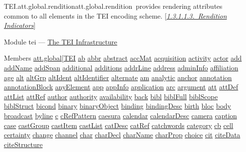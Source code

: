 \begin{reflist}
\item[]\begin{specHead}{TEI.att.global.rendition}{att.global.rendition} provides rendering attributes common to all elements in the TEI encoding scheme. [\textit{\hyperref[STGAre]{1.3.1.1.3.\ Rendition Indicators}}]\end{specHead} 
    \item[{Module}]
  tei — \hyperref[ST]{The TEI Infrastructure}
    \item[{Members}]
  \hyperref[TEI.att.global]{att.global}[\hyperref[TEI.TEI]{TEI} \hyperref[TEI.ab]{ab} \hyperref[TEI.abbr]{abbr} \hyperref[TEI.abstract]{abstract} \hyperref[TEI.accMat]{accMat} \hyperref[TEI.acquisition]{acquisition} \hyperref[TEI.activity]{activity} \hyperref[TEI.actor]{actor} \hyperref[TEI.add]{add} \hyperref[TEI.addName]{addName} \hyperref[TEI.addSpan]{addSpan} \hyperref[TEI.additional]{additional} \hyperref[TEI.additions]{additions} \hyperref[TEI.addrLine]{addrLine} \hyperref[TEI.address]{address} \hyperref[TEI.adminInfo]{adminInfo} \hyperref[TEI.affiliation]{affiliation} \hyperref[TEI.age]{age} \hyperref[TEI.alt]{alt} \hyperref[TEI.altGrp]{altGrp} \hyperref[TEI.altIdent]{altIdent} \hyperref[TEI.altIdentifier]{altIdentifier} \hyperref[TEI.alternate]{alternate} \hyperref[TEI.am]{am} \hyperref[TEI.analytic]{analytic} \hyperref[TEI.anchor]{anchor} \hyperref[TEI.annotation]{annotation} \hyperref[TEI.annotationBlock]{annotationBlock} \hyperref[TEI.anyElement]{anyElement} \hyperref[TEI.app]{app} \hyperref[TEI.appInfo]{appInfo} \hyperref[TEI.application]{application} \hyperref[TEI.arc]{arc} \hyperref[TEI.argument]{argument} \hyperref[TEI.att]{att} \hyperref[TEI.attDef]{attDef} \hyperref[TEI.attList]{attList} \hyperref[TEI.attRef]{attRef} \hyperref[TEI.author]{author} \hyperref[TEI.authority]{authority} \hyperref[TEI.availability]{availability} \hyperref[TEI.back]{back} \hyperref[TEI.bibl]{bibl} \hyperref[TEI.biblFull]{biblFull} \hyperref[TEI.biblScope]{biblScope} \hyperref[TEI.biblStruct]{biblStruct} \hyperref[TEI.bicond]{bicond} \hyperref[TEI.binary]{binary} \hyperref[TEI.binaryObject]{binaryObject} \hyperref[TEI.binding]{binding} \hyperref[TEI.bindingDesc]{bindingDesc} \hyperref[TEI.birth]{birth} \hyperref[TEI.bloc]{bloc} \hyperref[TEI.body]{body} \hyperref[TEI.broadcast]{broadcast} \hyperref[TEI.byline]{byline} \hyperref[TEI.c]{c} \hyperref[TEI.cRefPattern]{cRefPattern} \hyperref[TEI.caesura]{caesura} \hyperref[TEI.calendar]{calendar} \hyperref[TEI.calendarDesc]{calendarDesc} \hyperref[TEI.camera]{camera} \hyperref[TEI.caption]{caption} \hyperref[TEI.case]{case} \hyperref[TEI.castGroup]{castGroup} \hyperref[TEI.castItem]{castItem} \hyperref[TEI.castList]{castList} \hyperref[TEI.catDesc]{catDesc} \hyperref[TEI.catRef]{catRef} \hyperref[TEI.catchwords]{catchwords} \hyperref[TEI.category]{category} \hyperref[TEI.cb]{cb} \hyperref[TEI.cell]{cell} \hyperref[TEI.certainty]{certainty} \hyperref[TEI.change]{change} \hyperref[TEI.channel]{channel} \hyperref[TEI.char]{char} \hyperref[TEI.charDecl]{charDecl} \hyperref[TEI.charName]{charName} \hyperref[TEI.charProp]{charProp} \hyperref[TEI.choice]{choice} \hyperref[TEI.cit]{cit} \hyperref[TEI.citeData]{citeData} \hyperref[TEI.citeStructure]{citeStructure} 
\end{reflist}
